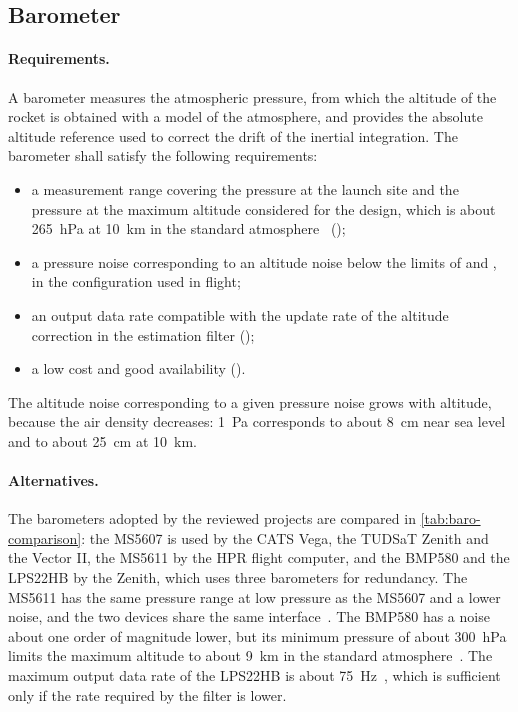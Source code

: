 \subsection{Barometer}
\label{sec:baro-choice}

\paragraph{Requirements.} A barometer measures the atmospheric pressure, from which the altitude of the rocket is obtained with a model of the atmosphere, and provides the absolute altitude reference used to correct the drift of the inertial integration. The barometer shall satisfy the following requirements:
\begin{itemize}
    \item a measurement range covering the pressure at the launch site and the pressure at the maximum altitude considered for the design, which is about \SI{265}{hPa} at \SI{10}{km} in the standard atmosphere~\cite{iso2533} ();
    \item a pressure noise corresponding to an altitude noise below the limits of  and , in the configuration used in flight;
    \item an output data rate compatible with the update rate of the altitude correction in the estimation filter ();
    \item a low cost and good availability ().
\end{itemize}
The altitude noise corresponding to a given pressure noise grows with altitude, because the air density decreases: \SI{1}{Pa} corresponds to about \SI{8}{cm} near sea level and to about \SI{25}{cm} at \SI{10}{km}.

\paragraph{Alternatives.} The barometers adopted by the reviewed projects are compared in \cref{tab:baro-comparison}: the MS5607 is used by the CATS Vega, the TUDSaT Zenith and the Vector II, the MS5611 by the HPR flight computer, and the BMP580 and the LPS22HB by the Zenith, which uses three barometers for redundancy. The MS5611 has the same pressure range at low pressure as the MS5607 and a lower noise, and the two devices share the same interface~\cite{ms5611:datasheet,ms5607:datasheet}. The BMP580 has a noise about one order of magnitude lower, but its minimum pressure of about \SI{300}{hPa} limits the maximum altitude to about \SI{9}{km} in the standard atmosphere~\cite{bmp580:datasheet}. The maximum output data rate of the LPS22HB is about \SI{75}{Hz}~\cite{lps22hb:datasheet}, which is sufficient only if the rate required by the filter is lower. 

